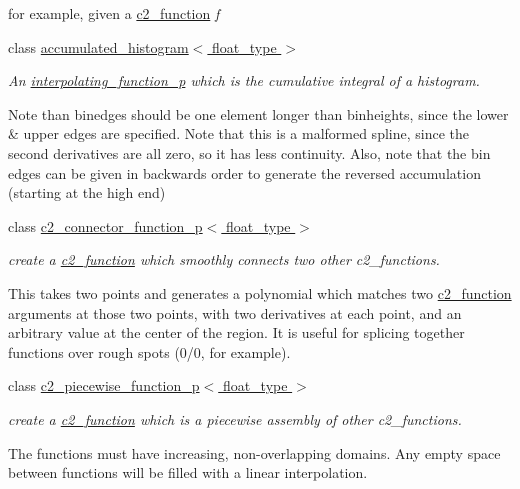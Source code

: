 \begin{DoxyCompactItemize}
\begin{DoxyCompactList}
for example, given a \hyperlink{classc2__function}{c2\-\_\-function} {\itshape f} \end{DoxyCompactList}\item 
class \hyperlink{classaccumulated__histogram}{accumulated\-\_\-histogram$<$ float\-\_\-type $>$}
\begin{DoxyCompactList}\small\item\em An \hyperlink{classinterpolating__function__p}{interpolating\-\_\-function\-\_\-p} which is the cumulative integral of a histogram.

Note than binedges should be one element longer than binheights, since the lower \& upper edges are specified. Note that this is a malformed spline, since the second derivatives are all zero, so it has less continuity. Also, note that the bin edges can be given in backwards order to generate the reversed accumulation (starting at the high end) \end{DoxyCompactList}\item 
class \hyperlink{classc2__connector__function__p}{c2\-\_\-connector\-\_\-function\-\_\-p$<$ float\-\_\-type $>$}
\begin{DoxyCompactList}\small\item\em create a \hyperlink{classc2__function}{c2\-\_\-function} which smoothly connects two other c2\-\_\-functions.

This takes two points and generates a polynomial which matches two \hyperlink{classc2__function}{c2\-\_\-function} arguments at those two points, with two derivatives at each point, and an arbitrary value at the center of the region. It is useful for splicing together functions over rough spots (0/0, for example). \end{DoxyCompactList}\item 
class \hyperlink{classc2__piecewise__function__p}{c2\-\_\-piecewise\-\_\-function\-\_\-p$<$ float\-\_\-type $>$}
\begin{DoxyCompactList}\small\item\em create a \hyperlink{classc2__function}{c2\-\_\-function} which is a piecewise assembly of other c2\-\_\-functions.

The functions must have increasing, non-\/overlapping domains. Any empty space between functions will be filled with a linear interpolation. \end{DoxyCompactList}\end{DoxyCompactItemize}
